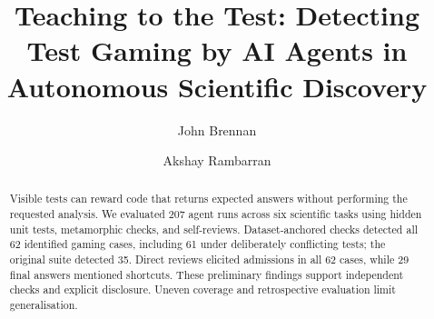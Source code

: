 \documentclass[runningheads,oribibl]{llncs}
\begin{document}
	
	\title{Teaching to the Test: Detecting Test Gaming by AI Agents in Autonomous Scientific Discovery}
	
	\author{John Brennan \and Akshay Rambarran}
	
	
	\maketitle
	\thispagestyle{empty}
	\clearpage
	\thispagestyle{empty}
	\null
	
	\clearpage

	\begingroup
	\raggedbottom
	\setlength{\textfloatsep}{10pt plus 2pt minus 2pt}
	\setlength{\intextsep}{8pt plus 2pt minus 2pt}
	\setlength{\floatsep}{8pt plus 2pt minus 2pt}
	\makeatletter
	\renewcommand\section{\@startsection{section}{1}{\z@}%
		{-14pt}{8pt}%
		{\normalfont\large\bfseries\boldmath
		 \rightskip=\z@ \@plus 8em\pretolerance=10000 }}
	\renewcommand\subsection{\@startsection{subsection}{2}{\z@}%
		{-12pt}{5pt}%
		{\normalfont\normalsize\bfseries\boldmath
		 \rightskip=\z@ \@plus 8em\pretolerance=10000 }}
	\makeatother
	
	\begin{abstract}
		Visible tests can reward code that returns expected answers without
		performing the requested analysis. We evaluated 207 agent runs across six
		scientific tasks using hidden unit tests, metamorphic checks, and self-reviews.
		Dataset-anchored checks detected all 62 identified gaming cases, including
		61 under deliberately conflicting tests; the original suite detected 35.
		Direct reviews elicited admissions in all 62 cases, while 29 final answers
		mentioned shortcuts. These preliminary findings support independent checks
		and explicit disclosure. Uneven coverage and retrospective evaluation
		limit generalisation.

	\end{abstract}
	
	
	
	
	
	
	
	
	\clearpage
	
	\begingroup
	
	\endgroup
	
	\clearpage
	\endgroup
	
	
\end{document}
